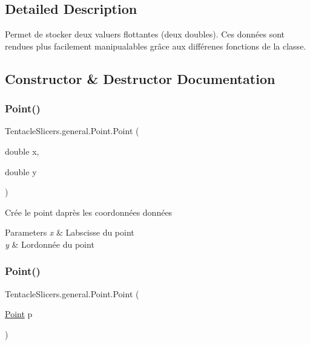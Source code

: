 \subsection{Detailed Description}
Permet de stocker deux valuers flottantes (deux doubles). Ces données sont rendues plus facilement manipualables grâce aux différenes fonctions de la classe. 



\subsection{Constructor \& Destructor Documentation}
\mbox{\label{class_tentacle_slicers_1_1general_1_1_point_a151224e258dcc89d3c970de7104d7cf2}} 
\subsubsection{\texorpdfstring{Point()}{Point()}\hspace{0.1cm}{\footnotesize\ttfamily [1/2]}}
{\footnotesize\ttfamily Tentacle\+Slicers.\+general.\+Point.\+Point (\begin{DoxyParamCaption}\item[{double}]{x,  }\item[{double}]{y }\end{DoxyParamCaption})}



Crée le point d\textquotesingle{}après les coordonnées données 


\begin{DoxyParams}{Parameters}
{\em x} & L\textquotesingle{}abscisse du point \\
\hline
{\em y} & L\textquotesingle{}ordonnée du point \\
\hline
\end{DoxyParams}
\mbox{\label{class_tentacle_slicers_1_1general_1_1_point_a9a664c443df2dfd25840318a85c804e0}} 
\subsubsection{\texorpdfstring{Point()}{Point()}\hspace{0.1cm}{\footnotesize\ttfamily [2/2]}}
{\footnotesize\ttfamily Tentacle\+Slicers.\+general.\+Point.\+Point (\begin{DoxyParamCaption}\item[{\hyperlink{class_tentacle_slicers_1_1general_1_1_point}{Point}}]{p }\end{DoxyParamCaption})}



